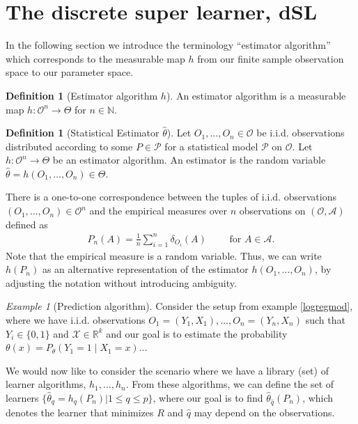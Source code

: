 \documentclass[11pt, a4paper]{article}
\theoremstyle{definition}
\newtheorem{definition}[theorem]{Definition}
\theoremstyle{remark}
\newtheorem{example}{Example}
\newcommand{\cl}{q}
\newcommand{\btheta}{h}
\begin{document}
\section{The discrete super learner, dSL}

In the following section we introduce the terminology ``estimator algorithm'' which corresponds to the measurable map $ h $ from our finite sample observation space to our parameter space. 
\begin{definition}[Estimator algorithm $ \btheta $]
    An estimator algorithm is a measurable map $ \btheta : \mathcal{O}^{n} \to \Theta $ for $ n \in \mathbb{N} $. 
\end{definition}
\begin{definition}[Statistical Estimator $ \hat{\theta} $]
    Let $ O_1, \ldots, O_n \in \mathcal{O} $ be i.i.d. observations distributed according to some $ P \in \mathcal{P} $ for a statistical model $ \mathcal{P} $ on $ \mathcal{O} $. Let $ \btheta : \mathcal{O}^{n} \to \Theta $ be an estimator algorithm. An estimator is the random variable $ \hat{\theta} = \btheta(O_1 ,\ldots , O_n) \in \Theta $. 
\end{definition}
There is a one-to-one correspondence between the tuples of i.i.d. observations $ (O_1 , \ldots, O_n) \in \mathcal{O}^{n} $ and the empirical measures over $ n $ observations on $ (\mathcal{O} , \mathcal{A}) $ defined as  
\begin{align*}
    P_n(A) = \frac{1}{n} \sum_{i = 1}^{n} \delta_{O_i}(A)\qquad \text{ for } A \in \mathcal{A}.
\end{align*}
Note that the empirical measure is a random variable. Thus, we can write $ \btheta(P_n)$ as an alternative representation of the estimator $\btheta(O_1, \ldots, O_n)$, by adjusting the notation without introducing ambiguity. 

\begin{example}[Prediction algorithm] 
    Consider the setup from example \ref{logregmod}, where we have i.i.d. observations $ O_1 = (Y_1 , X_1) ,\ldots, O_n = (Y_n , X_n) $ such that $ Y_i \in \{0,1\} $ and $ \mathcal{X}\in \mathbb{R}^{k} $ and our goal is to estimate the probability $ \theta(x) = P_{\theta}(Y_1 = 1 \mid X_1 = x ) $...
\end{example}
We would now like to consider the scenario where we have a library (set) of learner algorithms, $ \btheta_1 , \ldots, \btheta_n $. From these algorithms, we can define the set of learners $ \{ \hat{\theta} _{\cl} = \btheta_{\cl}(P_n) | 1 \leq \cl \leq p \} $, where our goal is to find $ \hat{\theta}_{ \hat{\cl} }(P_n) $, which denotes the learner that minimizes $ R $ and $ \hat{\cl}  $ may depend on the observations. 
\end{document}
